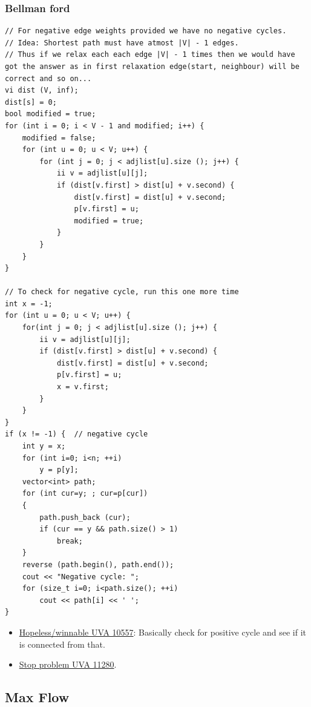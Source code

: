 \documentclass[8pt, a4paper, oneside, twocolumn]{extarticle}
\begin{document}
\subsubsection{Bellman ford}
\begin{verbatim} 
// For negative edge weights provided we have no negative cycles.
// Idea: Shortest path must have atmost |V| - 1 edges.
// Thus if we relax each each edge |V| - 1 times then we would have got the answer as in first relaxation edge(start, neighbour) will be correct and so on...
vi dist (V, inf);
dist[s] = 0;
bool modified = true;
for (int i = 0; i < V - 1 and modified; i++) {
    modified = false;
    for (int u = 0; u < V; u++) {
        for (int j = 0; j < adjlist[u].size (); j++) {
            ii v = adjlist[u][j];
            if (dist[v.first] > dist[u] + v.second) {
                dist[v.first] = dist[u] + v.second;
                p[v.first] = u;
                modified = true;
            }
        }
    }
}

// To check for negative cycle, run this one more time
int x = -1;
for (int u = 0; u < V; u++) {
    for(int j = 0; j < adjlist[u].size (); j++) {
        ii v = adjlist[u][j];
        if (dist[v.first] > dist[u] + v.second) {
            dist[v.first] = dist[u] + v.second;
            p[v.first] = u;
            x = v.first;
        }
    }
}
if (x != -1) {  // negative cycle
    int y = x;
    for (int i=0; i<n; ++i)
        y = p[y];
    vector<int> path;
    for (int cur=y; ; cur=p[cur])
    {
        path.push_back (cur);
        if (cur == y && path.size() > 1)
            break;
    }
    reverse (path.begin(), path.end());
    cout << "Negative cycle: ";
    for (size_t i=0; i<path.size(); ++i)
        cout << path[i] << ' ';
}
\end{verbatim}
\begin{itemize}
    \item \href{}{Hopeless/winnable UVA 10557}: Basically check for positive cycle and see if it is connected from that.
    \item \href{https://github.com/sourabhxyz/Competitive-Programming/blob/master/Summer%202017/UVA_11280.cpp}{Stop problem UVA 11280}.
\end{itemize}
\subsection{Max Flow}
\end{document}
